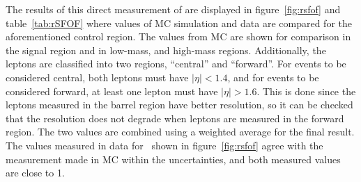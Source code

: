 The results of this direct measurement of \rsfof are displayed in figure~\ref{fig:rsfof} and table~\ref{tab:rSFOF}
where values of MC simulation and data are compared for the aforementioned control region.
The values from \ttbar MC are shown for comparison in the signal region and in low-mass, and high-mass regions.
Additionally, the leptons are classified into two regions, ``central'' and ``forward''.
For events to be considered central, both leptons must have $|\eta| < 1.4$,
and for events to be considered forward, at least one lepton must have $|\eta| > 1.6$.
This is done since the leptons measured in the barrel region have better resolution,
so it can be checked that the resolution does not degrade when leptons are measured in the forward region.
The two values are combined using a weighted average for the final result.
The values measured in data for \rsfof\ shown in figure~\ref{fig:rsfof} agree with the measurement made in MC within the uncertainties,
and both measured values are close to 1.

